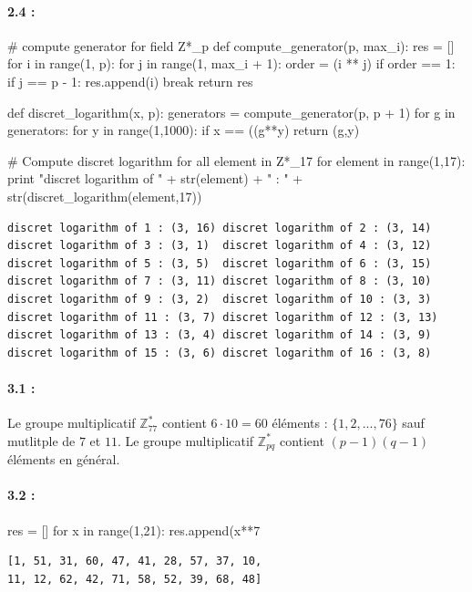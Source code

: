 \documentclass[11pt,a4paper]{report}
\begin{document}
\paragraph*{2.4 : }
\begin{pythoncode}
# compute generator for field Z*_p
def compute_generator(p, max_i):
    res = []
    for i in range(1, p):
        for j in range(1, max_i + 1):
            order = (i ** j) %
            if order == 1:
                if j == p - 1:
                    res.append(i)
                break
    return res

def discret_logarithm(x, p):
    generators = compute_generator(p, p + 1)
    for g in generators:
        for y in range(1,1000):
            if x == ((g**y) %
                return (g,y)


# Compute discret logarithm for all element in Z*_17
for element in range(1,17):
    print "discret logarithm of " + str(element) + " : " + str(discret_logarithm(element,17))
\end{pythoncode}
\begin{verbatim}
discret logarithm of 1 : (3, 16) discret logarithm of 2 : (3, 14)
discret logarithm of 3 : (3, 1)  discret logarithm of 4 : (3, 12)
discret logarithm of 5 : (3, 5)  discret logarithm of 6 : (3, 15)
discret logarithm of 7 : (3, 11) discret logarithm of 8 : (3, 10)
discret logarithm of 9 : (3, 2)  discret logarithm of 10 : (3, 3)
discret logarithm of 11 : (3, 7) discret logarithm of 12 : (3, 13)
discret logarithm of 13 : (3, 4) discret logarithm of 14 : (3, 9)
discret logarithm of 15 : (3, 6) discret logarithm of 16 : (3, 8)
\end{verbatim}

\paragraph*{3.1 : } Le groupe multiplicatif $\mathbb{Z}^*_{77}$ contient $6\cdot10=60$ éléments : $\{1,2,...,76\}$ sauf mutlitple de $7$ et $11$. Le groupe multiplicatif $\mathbb{Z}^*_{pq}$ contient $(p-1)(q-1)$ éléments en général.

\paragraph*{3.2 : }
\begin{pythoncode}
res = []
for x in range(1,21):
    res.append(x**7 %
\end{pythoncode}
\begin{verbatim}
[1, 51, 31, 60, 47, 41, 28, 57, 37, 10,
11, 12, 62, 42, 71, 58, 52, 39, 68, 48]
\end{verbatim}
\end{document}
